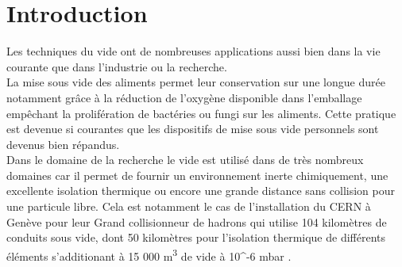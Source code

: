 \section{Introduction}


Les techniques du vide ont de nombreuses applications aussi bien dans la vie courante que dans l'industrie ou la recherche. \\
La mise sous vide des aliments permet leur conservation sur une longue durée notamment grâce à la réduction de l'oxygène disponible dans l'emballage empêchant la prolifération de bactéries ou fungi sur les aliments. Cette pratique est devenue si courantes que les dispositifs de mise sous vide personnels sont devenus bien répandus. \\
Dans le domaine de la recherche le vide est utilisé dans de très nombreux domaines car il permet de fournir un environnement inerte chimiquement, une excellente isolation thermique ou encore une grande distance sans collision pour une particule libre. Cela est notamment le cas de l'installation du CERN à Genève pour leur Grand collisionneur de hadrons qui utilise 104 kilomètres de conduits sous vide, dont 50 kilomètres pour l'isolation thermique de différents éléments s'additionant à 15 000 \unit{\cubic \meter} de vide à 10^{-6} \unit{\milli \bar} \cite{CERN}.

